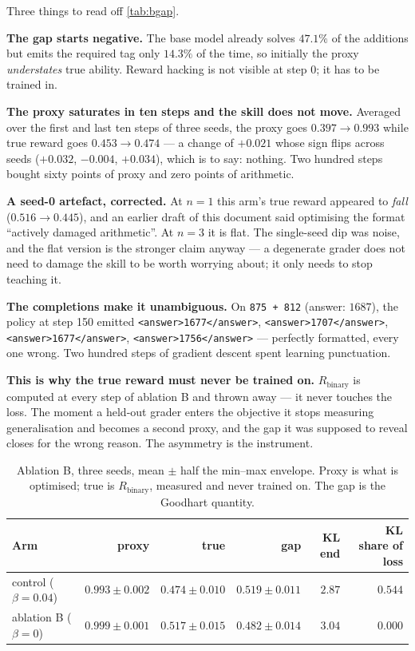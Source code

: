 \documentclass[11pt,letterpaper]{article}
\theoremstyle{definition}
\begin{document}
Three things to read off \cref{tab:bgap}.

\textbf{The gap starts negative.} The base model already solves $47.1\%$ of the additions but emits
the required tag only $14.3\%$ of the time, so initially the proxy \emph{understates} true ability.
Reward hacking is not visible at step 0; it has to be trained in.

\textbf{The proxy saturates in ten steps and the skill does not move.} Averaged over the first and
last ten steps of three seeds, the proxy goes $0.397 \to 0.993$ while true reward goes $0.453 \to
0.474$ --- a change of $+0.021$ whose sign flips across seeds ($+0.032$, $-0.004$, $+0.034$), which
is to say: nothing. Two hundred steps bought sixty points of proxy and zero points of arithmetic.

\begin{aside}
\textbf{A seed-0 artefact, corrected.} At $n=1$ this arm's true reward appeared to \emph{fall}
($0.516 \to 0.445$), and an earlier draft of this document said optimising the format ``actively
damaged arithmetic''. At $n=3$ it is flat. The single-seed dip was noise, and the flat version is the
stronger claim anyway --- a degenerate grader does not need to damage the skill to be worth
worrying about; it only needs to stop teaching it.
\end{aside}

\textbf{The completions make it unambiguous.} On \texttt{875 + 812} (answer: $1687$), the policy at
step 150 emitted \texttt{<answer>1677</answer>}, \texttt{<answer>1707</answer>},
\texttt{<answer>1677</answer>}, \texttt{<answer>1756</answer>} --- perfectly formatted, every one
wrong. Two hundred steps of gradient descent spent learning punctuation.

\begin{aside}
\textbf{This is why the true reward must never be trained on.} $R_{\text{binary}}$ is computed at
every step of ablation B and thrown away --- it never touches the loss. The moment a held-out grader
enters the objective it stops measuring generalisation and becomes a second proxy, and the gap it was
supposed to reveal closes for the wrong reason. The asymmetry is the instrument.
\end{aside}

\begin{table}[H]
\centering
\caption{Ablation B, three seeds, mean $\pm$ half the min--max envelope. Proxy is what is optimised;
true is $R_{\text{binary}}$, measured and never trained on. The gap is the Goodhart quantity.}
\label{tab:abB}
\small
\begin{tabular}{@{}lrrrrr@{}}
\toprule
\textbf{Arm} & \textbf{proxy} & \textbf{true} & \textbf{gap} & \textbf{KL end} & \textbf{KL share of loss} \\
\midrule
control ($\beta = 0.04$) & $0.993 \pm 0.002$ & $0.474 \pm 0.010$ & $\mathbf{0.519 \pm 0.011}$ & $2.87$ & $0.544$ \\
ablation B ($\beta = 0$)  & $0.999 \pm 0.001$ & $0.517 \pm 0.015$ & $\mathbf{0.482 \pm 0.014}$ & $3.04$ & $0.000$ \\
\bottomrule
\end{tabular}
\end{table}
\end{document}
